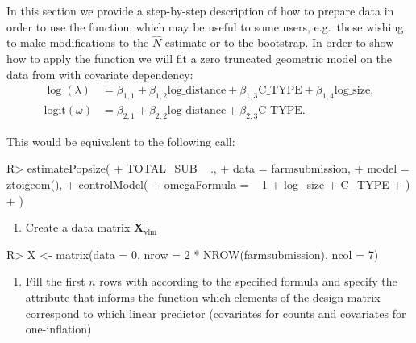 \documentclass[nojss]{jss}
\providecommand{\tightlist}{%
  \setlength{\itemsep}{0pt}\setlength{\parskip}{0pt}}
\newcommand{\1}{\mathcal{I}} \newcommand{\bZero}{\boldsymbol{0}}
\begin{document}
In this section we provide a step-by-step description of how to prepare
data in order to use the  function, which may
be useful to some users, e.g.~those wishing to make modifications to the
\(\hat{N}\) estimate or to the bootstrap. In order to show how to apply
the function we will fit a zero truncated geometric model on the data
from \citet{chao-generalization} with covariate dependency:
\begin{align*}
  \log(\lambda) &=
  \beta_{1, 1} + \beta_{1, 2} \text{log\_distance} + \beta_{1, 3} \text{C\_TYPE} +
  \beta_{1, 4} \text{log\_size}, \\
  \text{logit}(\omega) &=
  \beta_{2, 1} + \beta_{2, 2} \text{log\_distance} + \beta_{2, 3} \text{C\_TYPE}.
\end{align*}

This would be equivalent to the following  call:

\begin{CodeChunk}
\begin{CodeInput}
R> estimatePopsize(
+   TOTAL_SUB ~ .,
+   data = farmsubmission,
+   model = ztoigeom(),
+   controlModel(
+     omegaFormula = ~ 1 + log_size + C_TYPE
+   )
+ )
\end{CodeInput}
\end{CodeChunk}

\begin{enumerate}
\def\labelenumi{\arabic{enumi}.}
\tightlist
\item
  Create a data matrix \(\boldsymbol{X}_{\text{vlm}}\)
\end{enumerate}

\begin{CodeChunk}
\begin{CodeInput}
R> X <- matrix(data = 0, nrow = 2 * NROW(farmsubmission), ncol = 7)
\end{CodeInput}
\end{CodeChunk}

\begin{enumerate}
\def\labelenumi{\arabic{enumi}.}
\setcounter{enumi}{1}
\tightlist
\item
  Fill the first \(n\) rows with  according to the
  specified formula and specify the attribute  that
  informs the function which elements of the design matrix correspond to
  which linear predictor (covariates for counts and covariates for
  one-inflation)
\end{enumerate}
\end{document}
